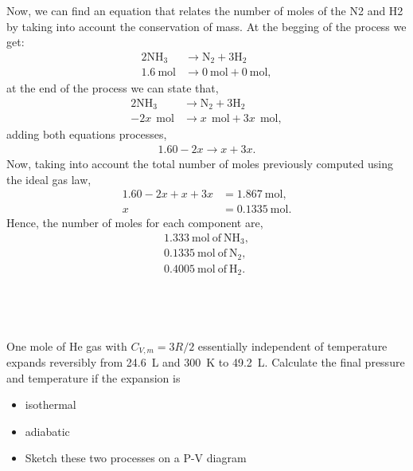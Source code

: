 \documentclass[main.tex]{subfiles}
\begin{document}
Now, we can find an equation that relates the number of moles of the N2 and H2 by taking into account the conservation of mass.
At the begging  of the process we get:
\begin{align*}
    2\mathrm{NH}_3 &\to \mathrm{N}_2 + 3\mathrm{H}_2 \\
    \SI{1.6}{\mol} &\to \SI{0}{\mol} + \SI{0}{\mol},
\end{align*}
at the end of the process we can state that,
\begin{align*}
    2\mathrm{NH}_3 &\to \mathrm{N}_2 + 3\mathrm{H}_2 \\
    -2x~\SI{}{\mol} &\to x~\SI{}{\mol} + 3x~\SI{}{\mol},
\end{align*}
adding both equations processes,
\begin{align*}
    1.60-2x \to x+3x.
\end{align*}
Now, taking into account the total number of moles previously computed using the ideal gas law,
\begin{align*}
    1.60-2x + x+3x &= \SI{1.867}{\mol}, \\
    x &= \SI{0.1335}{\mol}.
\end{align*}
Hence, the number of moles for each component are,
\begin{gather*}
    \boxed{\SI{1.333}{\mol}~\mathrm{of~NH}_3,} \\
    \boxed{\SI{0.1335}{\mol}~\mathrm{of~N}_2,} \\
    \boxed{\SI{0.4005}{\mol}~\mathrm{of~H}_2.}
\end{gather*}


\subsection{~}
One mole of He gas with $C_{V,m} = 3R/2$ essentially independent of temperature expands reversibly from \SI{24.6}{\liter} and \SI{300}{\kelvin} to \SI{49.2}{\liter}.
Calculate the final pressure and temperature if the expansion is
\begin{itemize}
    \item isothermal
    \item adiabatic
    \item Sketch these two processes on a P-V diagram
\end{itemize}
\end{document}
